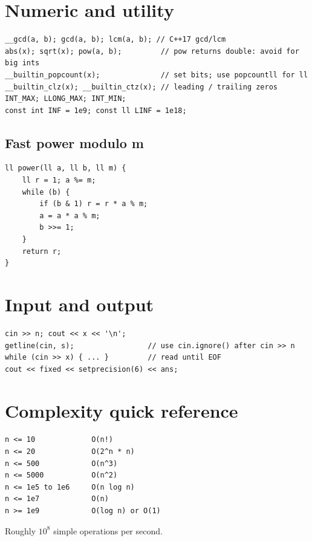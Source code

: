 \section{Numeric and utility}
\begin{lstlisting}
__gcd(a, b); gcd(a, b); lcm(a, b); // C++17 gcd/lcm
abs(x); sqrt(x); pow(a, b);         // pow returns double: avoid for big ints
__builtin_popcount(x);              // set bits; use popcountll for ll
__builtin_clz(x); __builtin_ctz(x); // leading / trailing zeros
INT_MAX; LLONG_MAX; INT_MIN;
const int INF = 1e9; const ll LINF = 1e18;
\end{lstlisting}

\subsection{Fast power modulo m}
\begin{lstlisting}
ll power(ll a, ll b, ll m) {
    ll r = 1; a %= m;
    while (b) {
        if (b & 1) r = r * a % m;
        a = a * a % m;
        b >>= 1;
    }
    return r;
}
\end{lstlisting}

\section{Input and output}
\begin{lstlisting}
cin >> n; cout << x << '\n';
getline(cin, s);                 // use cin.ignore() after cin >> n
while (cin >> x) { ... }         // read until EOF
cout << fixed << setprecision(6) << ans;
\end{lstlisting}

\section{Complexity quick reference}
\begin{lstlisting}
n <= 10             O(n!)
n <= 20             O(2^n * n)
n <= 500            O(n^3)
n <= 5000           O(n^2)
n <= 1e5 to 1e6     O(n log n)
n <= 1e7            O(n)
n >= 1e9            O(log n) or O(1)
\end{lstlisting}
Roughly $10^8$ simple operations per second.

